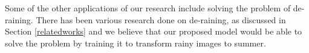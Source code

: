 \documentclass{article}
\begin{document}



Some of the other applications of our research include solving the problem of de-raining. There has been various research 
 done on de-raining, as discussed in Section \ref{relatedworks} and we believe that our proposed model would be able to solve the problem by training it to transform rainy images to summer.


\end{document}
